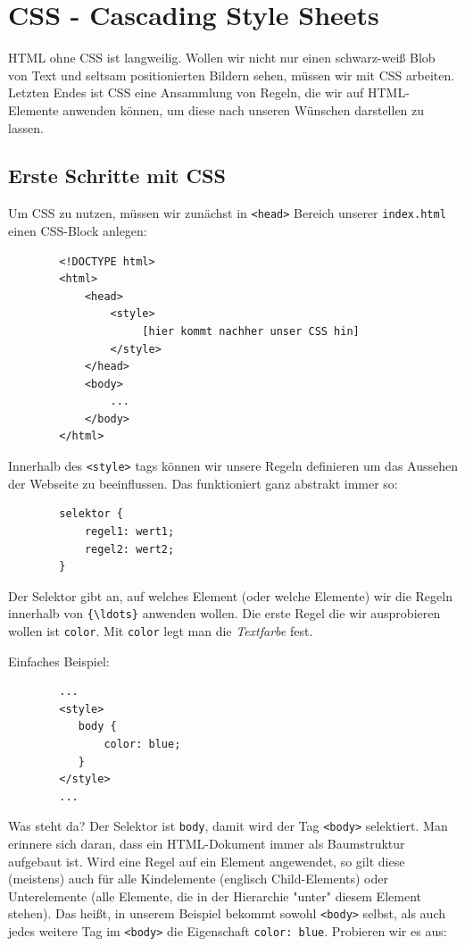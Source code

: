 \documentclass[11pt]{article}
\begin{document}
    \section{CSS - Cascading Style Sheets}

    HTML ohne CSS ist langweilig.
    Wollen wir nicht nur einen schwarz-weiß Blob von Text und seltsam positionierten Bildern sehen,
    müssen wir mit CSS arbeiten.
    Letzten Endes ist CSS eine Ansammlung von Regeln, die wir auf HTML-Elemente anwenden können,
    um diese nach unseren Wünschen darstellen zu lassen.

    \subsection{Erste Schritte mit CSS}

    Um CSS zu nutzen, müssen wir zunächst in \Verb"<head>" Bereich unserer \Verb"index.html" einen CSS-Block anlegen:

    \begin{verbatim}
        <!DOCTYPE html>
        <html>
            <head>
                <style>
                     [hier kommt nachher unser CSS hin]
                </style>
            </head>
            <body>
                ...
            </body>
        </html>
    \end{verbatim}

    Innerhalb des \Verb"<style>" tags können wir unsere Regeln definieren um das Aussehen der Webseite zu beeinflussen.
    Das funktioniert ganz abstrakt immer so:

    \begin{verbatim}
        selektor {
            regel1: wert1;
            regel2: wert2;
        }
    \end{verbatim}

    Der Selektor gibt an, auf welches Element (oder welche Elemente) wir die Regeln innerhalb von \Verb"{\ldots}"
    anwenden wollen.
    Die erste Regel die wir ausprobieren wollen ist \Verb"color".
    Mit \Verb"color" legt man die \textit{Textfarbe} fest.

    Einfaches Beispiel:

    \begin{verbatim}
        ...
        <style>
           body {
               color: blue;
           }
        </style>
        ...
    \end{verbatim}

    Was steht da?
    Der Selektor ist \Verb"body", damit wird der Tag \Verb"<body>" selektiert.
    Man erinnere sich daran, dass ein HTML-Dokument immer als Baumstruktur aufgebaut ist.
    Wird eine Regel auf ein Element angewendet, so gilt diese (meistens) auch für alle Kindelemente (englisch Child-Elements)
    oder Unterelemente (alle Elemente, die in der Hierarchie "unter" diesem Element stehen).
    Das heißt, in unserem Beispiel bekommt sowohl \Verb"<body>" selbst, als auch jedes weitere Tag im \Verb"<body>" die
    Eigenschaft \Verb"color: blue".
    Probieren wir es aus: \newpage
\end{document}
